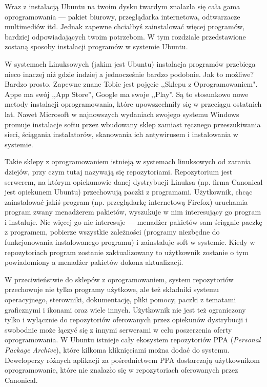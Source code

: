 Wraz z instalacją Ubuntu na twoim dysku twardym znalazła się cała gama oprogramowania --- pakiet biurowy, przeglądarka internetowa, odtwarzacze multimediów itd. Jednak zapewne chciałbyś zainstalować więcej programów, bardziej odpowiadających twoim potrzebom. W tym rozdziale przedstawione zostaną sposoby instalacji programów w systemie Ubuntu.

W systemach Linuksowych (jakim jest Ubuntu) instalacja programów przebiega nieco inaczej niż gdzie indziej a jednocześnie bardzo podobnie. Jak to możliwe? Bardzo prosto. Zapewne znane Tobie jest pojęcie ,,Sklepu z Oprogramowaniem". Appe ma swój ,,App Store'', Google ma swoje ,,Play''. Są to stosunkowo nowe metody instalacji oprogramowania, które upowszechniły się w przeciągu ostatnich lat. Nawet Microsoft w najnowszych wydaniach swojego systemu Windows promuje instalacje softu przez wbudowany sklep zamiast ręcznego przeszukiwania sieci, ściągania instalatorów, skanowania ich antywirusem i instalowania w systemie.

Takie sklepy z oprogramowaniem istnieją w systemach linuksowych od zarania dziejów, przy czym tutaj nazywają się \textcolor{ubuntu_orange}{repozytoriami}. Repozytorium jest serwerem, na którym opiekunowie danej dystrybucji Linuksa (np. firma Canonical jest opiekunem Ubuntu) przechowują paczki z programami. Użytkownik, chcąc zainstalować jakiś program (np. przeglądarkę internetową Firefox) uruchamia program zwany \textcolor{ubuntu_orange}{menadżerem pakietów}, wyszukuje w nim interesujący go program i instaluje. Nic więcej go nie interesuje --- menadżer pakietów sam ściągnie paczkę z programem, pobierze wszystkie zależności (programy niezbędne do funkcjonowania instalowanego programu) i zainstaluje soft w systemie. Kiedy w repozytoriach program zostanie zaktualizowany to użytkownik zostanie o tym powiadomiony a menadżer pakietów dokona aktualizacji.

W przeciwieństwie do sklepów z oprogramowaniem, system repozytoriów przechowuje nie tylko programy użytkowe, ale też składniki systemu operacyjnego, sterowniki, dokumentację, pliki pomocy, paczki z tematami graficznymi i ikonami oraz wiele innych. Użytkownik nie jest też ograniczony tylko i wyłącznie do repozytoriów oferowanych przez opiekunów dystrybucji i swobodnie może łączyć się z innymi serwerami w celu poszerzenia oferty oprogramowania. W Ubuntu istnieje cały ekosystem repozytoriów PPA (\textit{Personal Package Archive}), które kilkoma kliknięciami można dodać do systemu. Deweloperzy różnych aplikacji za pośrednictwem PPA dostarczają użytkownikom oprogramowanie, które nie znalazło się w repozytoriach oferowanych przez Canonical.

